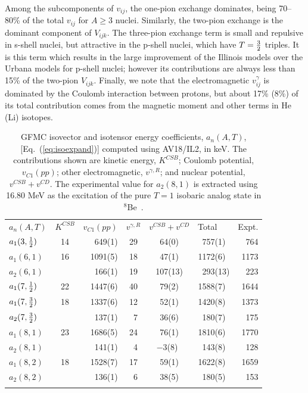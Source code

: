 Among the subcomponents of $v_{ij}$, the one-pion exchange dominates,
being 70--80\% of the total $v_{ij}$ for $A\geq3$ nuclei.
Similarly, the two-pion exchange is the dominant component of $V_{ijk}$.
The three-pion exchange term is small and repulsive in s-shell nuclei,
but attractive in the p-shell nuclei, which have $T=\textstyle{3\over2}$ triples.
It is this term which results in the large improvement of the Illinois
models over the Urbana models for p-shell nuclei; however its contributions
are always less than 15\% of the two-pion $V_{ijk}$.
Finally, we note that the electromagnetic $v^\gamma_{ij}$ is dominated by the
Coulomb interaction between protons, but about 17\% (8\%) of
its total contribution comes from the magnetic moment and other terms
in He (Li) isotopes.

\begin{table}
\caption{GFMC isovector and isotensor energy coefficients, $a_n(A,T)$,
[Eq.~(\protect\ref{eq:isoexpand})] computed using AV18/IL2, in keV.
The contributions shown are kinetic energy, $K^{CSB}$; 
Coulomb potential, $v_{C1}(pp)$; other electromagnetic, $v^{\gamma,R}$;
and nuclear potential, $v^{CSB}+v^{CD}$.
The experimental value for $a_2(8,1)$ is extracted using
16.80 MeV as the excitation of the pure $T=1$ isobaric analog state 
in $^8$Be~\protect\cite{B66}.}
\label{tab:analog}
\begin{tabular}{lcrccrr}
\toprule
$a_n(A,T)$         & $K^{CSB}$& $v_{C1}(pp)$ & $v^{\gamma,R}$                               
                                                  & $v^{CSB}+v^{CD}$ & Total~~~ & Expt.\\
\colrule              
$a_1(3,\textstyle{1\over2})$ &   14  &     649(1)   &    29   &   ~64(0)~ &  757(1)~ &   764\\ 
$a_1(6,1)$           &   16  &    1091(5)   &    18   &   ~47(1)~ & 1172(6)~ &  1173 \\
$a_2(6,1)$           &       &     166(1)   &    19   &   107(13) & 293(13)  &   223 \\ 
$a_1(7,\textstyle{1\over2})$ &   22  &    1447(6)   &    40   &   ~79(2)~ & 1588(7)~ &  1644 \\
$a_1(7,\textstyle{3\over2})$ &   18  &    1337(6)   &    12   &   ~52(1)~ & 1420(8)~ &  1373 \\
$a_2(7,\textstyle{3\over2})$ &       &     137(1)   &    ~7   &   ~36(6)~ &  180(7)~ &   175 \\
$a_1(8,1)$           &   23  &    1686(5)   &    24   &   ~76(1)~ & 1810(6)~ &  1770 \\
$a_2(8,1)$           &       &     141(1)   &    ~4   &  $-$3(8)~ & 143(8)~  &   128 \\ 
$a_1(8,2)$           &   18  &    1528(7)   &    17   &   ~59(1)~ & 1622(8)~ &  1659 \\
$a_2(8,2)$           &       &     136(1)   &    ~6   &   ~38(5)~ & 180(5)~  &   153 \\ 
\botrule 
\end{tabular}
\end{table}

